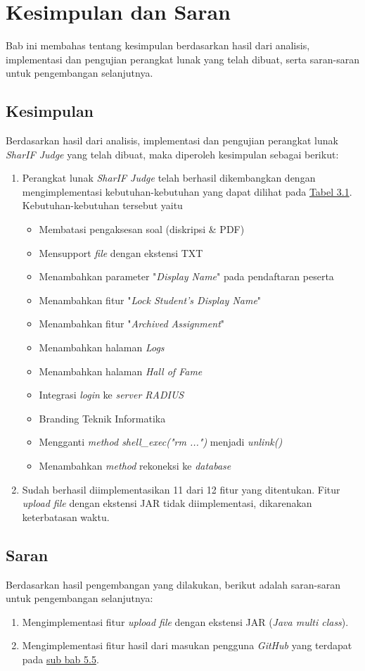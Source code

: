 \chapter{Kesimpulan dan Saran}
\label{chap:kesimpulan dan saran}

Bab ini membahas tentang kesimpulan berdasarkan hasil dari analisis, implementasi dan pengujian perangkat lunak yang telah dibuat, serta saran-saran untuk pengembangan selanjutnya.

\section{Kesimpulan}
Berdasarkan hasil dari analisis, implementasi dan pengujian perangkat lunak \textit{SharIF Judge} yang telah dibuat, maka diperoleh kesimpulan sebagai berikut:
\begin{enumerate}
	\item Perangkat lunak \textit{SharIF Judge} telah berhasil dikembangkan dengan mengimplementasi kebutuhan-kebutuhan yang dapat dilihat pada \hyperref[tab:kebutuhan]{Tabel 3.1}. Kebutuhan-kebutuhan tersebut yaitu
	\begin{itemize}
		\item Membatasi pengaksesan soal (diskripsi \& PDF)
		\item Mensupport \textit{file} dengan ekstensi TXT
		\item Menambahkan parameter "\textit{Display Name}" pada pendaftaran peserta
		\item Menambahkan fitur "\textit{Lock Student's Display Name}"
		\item Menambahkan fitur "\textit{Archived Assignment}"
		\item Menambahkan halaman \textit{Logs}
		\item Menambahkan halaman \textit{Hall of Fame}
		\item Integrasi \textit{login} ke \textit{server RADIUS}
		\item Branding Teknik Informatika
		\item Mengganti \textit{method shell\_exec("rm ...")} menjadi\textit{ unlink()}
		\item Menambahkan \textit{method} rekoneksi ke \textit{database}
	\end{itemize}

	\item Sudah berhasil diimplementasikan 11 dari 12 fitur yang ditentukan. Fitur \textit{upload file} dengan ekstensi JAR tidak diimplementasi, dikarenakan keterbatasan waktu.
\end{enumerate}

\section{Saran}
Berdasarkan hasil pengembangan yang dilakukan, berikut adalah saran-saran untuk pengembangan selanjutnya:
\begin{enumerate}
	\item Mengimplementasi fitur \textit{upload file} dengan ekstensi JAR (\textit{Java multi class}).
	\item Mengimplementasi fitur hasil dari masukan pengguna \textit{GitHub} yang terdapat pada \hyperref[sec:masukangithub]{sub bab 5.5}.
\end{enumerate}